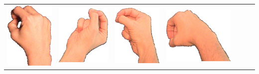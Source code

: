 \documentclass{article}
\begin{document}
\begin{center}
\begin{tabular}{r*{6}{c}}
\includegraphics[scale=0.1]{images/03-06-3.jpg}&
\includegraphics[scale=0.1]{images/03-06-4.jpg}&
\includegraphics[scale=0.1]{images/03-06-5.jpg}&
\includegraphics[scale=0.1]{images/03-06-6.jpg}\\

\end{tabular}
\end{center}
\end{document}
